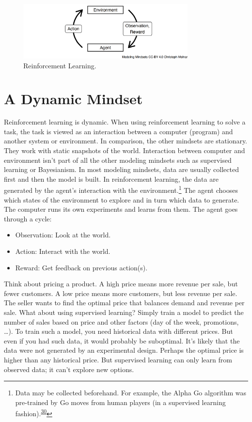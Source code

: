 \documentclass[
  10pt,
]{scrbook}
\providecommand{\tightlist}{%
  \setlength{\itemsep}{0pt}\setlength{\parskip}{0pt}}
\begin{document}
\begin{figure}

{\centering \includegraphics[width=0.8\textwidth]{figures/rl-1} 

}

\caption{Reinforcement Learning.}\label{fig:rl}
\end{figure}

\hypertarget{a-dynamic-mindset}{%
\section{A Dynamic Mindset}\label{a-dynamic-mindset}}

Reinforcement learning is dynamic.
When using reinforcement learning to solve a task, the task is viewed as an interaction between a computer (program) and another system or environment.
In comparison, the other mindsets are stationary.
They work with static snapshots of the world.
Interaction between computer and environment isn't part of all the other modeling mindsets such as supervised learning or Bayesianism.
In most modeling mindsets, data are usually collected first and then the model is built.
In reinforcement learning, the data are generated by the agent's interaction with the environment.\footnote{Data may be collected beforehand. For example, the Alpha Go algorithm was pre-trained by Go moves from human players (in a supervised learning fashion).\textsuperscript{\protect\hyperlink{ref-chen2018recurrent}{30}}}
The agent chooses which states of the environment to explore and in turn which data to generate.
The computer runs its own experiments and learns from them.
The agent goes through a cycle:

\begin{itemize}
\tightlist
\item
  Observation: Look at the world.
\item
  Action: Interact with the world.
\item
  Reward: Get feedback on previous action(s).
\end{itemize}

Think about pricing a product.
A high price means more revenue per sale, but fewer customers.
A low price means more customers, but less revenue per sale.
The seller wants to find the optimal price that balances demand and revenue per sale.
What about using supervised learning?
Simply train a model to predict the number of sales based on price and other factors (day of the week, promotions, \ldots).
To train such a model, you need historical data with different prices.
But even if you had such data, it would probably be suboptimal.
It's likely that the data were not generated by an experimental design.
Perhaps the optimal price is higher than any historical price.
But supervised learning can only learn from observed data; it can't explore new options.
\end{document}
